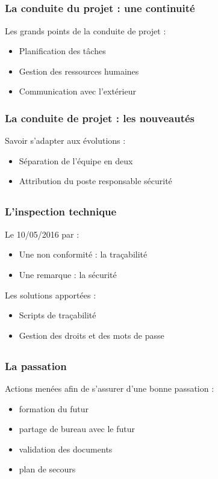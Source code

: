 \speaker{\Sergi{}}
\subsection{} %

\begin{frame}
\frametitle{La conduite du projet : une continuité}
Les grands points de la conduite de projet :
\begin{itemize}
	\item Planification des tâches
	\item Gestion des ressources humaines
	\item Communication avec l'extérieur
\end{itemize}
\end{frame}

\begin{frame}
\frametitle{La conduite de projet : les nouveautés}
Savoir s'adapter aux évolutions :
\begin{itemize}
	\item Séparation de l'équipe en deux
	\item Attribution du poste responsable sécurité
\end{itemize}

\end{frame}

\subsection{}
\begin{frame}
\frametitle{L'inspection technique}
Le 10/05/2016 par \nomTuteurPedago{} :
\begin{itemize}
	\item Une non conformité : la traçabilité
	\item Une remarque : la sécurité
\end{itemize}
Les solutions apportées :
\begin{itemize}
	\item Scripts de traçabilité
	\item Gestion des droits et des mots de passe
\end{itemize}
\end{frame}

\subsection{}
\begin{frame}
\frametitle{La passation}
Actions menées afin de s'assurer d'une bonne passation :
\begin{itemize}
	\item formation du futur \CP{}
	\item partage de bureau avec le futur \CP{}
	\item validation des documents
	\item plan de secours
\end{itemize}
\end{frame}



